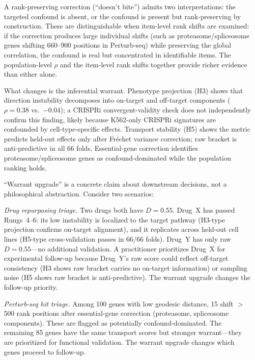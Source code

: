 \documentclass[11pt]{article}
\begin{document}
A rank-preserving correction (``doesn't bite'') admits two
interpretations: the targeted confound is absent, or the confound is
present but rank-preserving by construction. These are distinguishable
when item-level rank shifts are examined: if the correction produces
large individual shifts (such as proteasome/spliceosome genes shifting
660--900 positions in Perturb-seq) while preserving the global
correlation, the confound is real but concentrated in identifiable items.
The population-level $\rho$ and the item-level rank shifts together
provide richer evidence than either alone.

What changes is the inferential warrant. Phenotype projection (H3) shows
that direction instability decomposes into on-target and off-target
components ($\rho = 0.38$ vs.\ $-0.04$); a CRISPRi convergent-validity
check does not independently confirm this finding, likely because
K562-only CRISPRi signatures are confounded by cell-type-specific
effects. Transport stability (H5) shows
the metric predicts held-out effects only after Fr\'{e}chet variance
correction; raw bracket is anti-predictive in all 66 folds. Essential-gene
correction identifies proteasome/spliceosome genes as confound-dominated
while the population ranking holds.

``Warrant upgrade'' is a concrete claim about downstream decisions, not
a philosophical abstraction. Consider two scenarios:

\emph{Drug repurposing triage.} Two drugs both have $D = 0.55$.
Drug~X has passed Rungs~4--6: its low instability is localized to the
target pathway (H3-type projection confirms on-target alignment), and it
replicates across held-out cell lines (H5-type cross-validation passes
in 66/66 folds).
Drug~Y has only raw $D = 0.55$---no additional validation. A practitioner
prioritizes Drug~X for experimental follow-up because Drug~Y's raw score
could reflect off-target consistency (H3 shows raw bracket carries no
on-target information) or sampling noise (H5 shows raw bracket is
anti-predictive). The warrant upgrade changes the follow-up priority.

\emph{Perturb-seq hit triage.} Among 100 genes with low geodesic
distance, 15 shift $>$500 rank positions after essential-gene correction
(proteasome, spliceosome components). These are flagged as potentially
confound-dominated. The remaining 85 genes have the same transport
scores but stronger warrant---they are prioritized for functional
validation. The warrant upgrade changes which genes proceed to follow-up.
\end{document}
